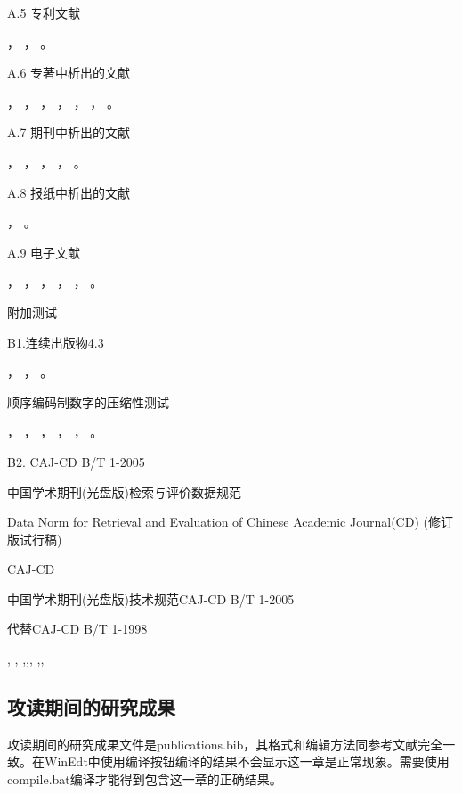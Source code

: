 A.5 专利文献

\cite{LIUJIALIN1993}，
\cite{hblz2001}，
\cite{KOSEKI2002}。

A.6 专著中析出的文献

\cite{baishunong1998}，
\cite{gjbzjxxflbmyjs1988}，
\cite{hanjiren1985}，
\cite{BUSECK1980}，
\cite{FOURNEY1971}，
\cite{feilisheng1981}，
\cite{MARTIN1996}。

A.7 期刊中析出的文献

\cite{libingmu2000}，
\cite{taorengji1984}，
\cite{yzdztbmz1978}，
\cite{MARAIS1992}，
\cite{HEWITT1984}。

A.8 报纸中析出的文献

\cite{Dingwenxiang2000}，
\cite{Zhangtianqing2000}。

A.9 电子文献

\cite{jiangxiangdong1999}，
\cite{xiaoniu2001}，
\cite{CHRISTINE1998}，
\cite{METCALF1995}，
\cite{TURCOTTE1992}，
\cite{Scitor1983}。

附加测试

B1.连续出版物4.3

\cite{zgdzxh1936}，
\cite{zgtsgxh1957}，
\cite{AAAS1883}。

顺序编码制数字的压缩性测试

\cite{angwen1988,baishunong1998,Dingwenxiang2000,gxzzzzqlyt1993,
jiangyouxu1998,tangxujun1999,zhaokaihua1995,wangang1912,zhaoyaodong1998}，
\cite{crawfprd1995}，
\cite{iflai1977}，
\cite{obrien1994}，
\cite{rood2001}，
\cite{angwen1988}。

B2. CAJ-CD B/T 1-2005

中国学术期刊(光盘版)检索与评价数据规范

Data Norm for Retrieval and Evaluation of Chinese Academic Journal(CD) (修订版试行稿)

CAJ-CD

中国学术期刊(光盘版)技术规范CAJ-CD B/T 1-2005

代替CAJ-CD B/T 1-1998

\cite[12]{zhuyixuan1985},
\cite{yejianying1946},
\cite{gwywgzjj1958},\cite{shenkuogwywgzjj1070},\cite{jiyun1800},
\cite{liujiang2004},\cite{wanjingkun1996},\cite{dai1983}
\subsection{攻读期间的研究成果}
攻读期间的研究成果文件是publications.bib，其格式和编辑方法同参考文献完全一致。在WinEdt中使用编译按钮编译的结果不会显示这一章是正常现象。需要使用compile.bat编译才能得到包含这一章的正确结果。


